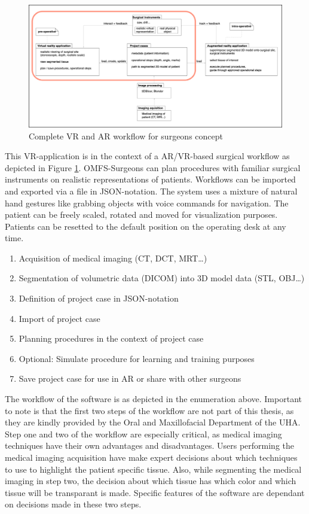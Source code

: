 \begin{figure}[ht!]
    \centering
    \includegraphics[width=\linewidth]{images/project_plan.png}
    \caption{\label{fig::ProjectPlan} Complete VR and AR workflow for surgeons concept}
\end{figure}

This VR-application is in the context of a AR/VR-based surgical workflow as depicted in Figure \ref{fig::ProjectPlan}.
OMFS-Surgeons can plan procedures with familiar surgical instruments on realistic representations of patients.
Workflows can be imported and exported via a file in JSON-notation.
The system uses a mixture of natural hand gestures like grabbing objects with voice commands for navigation.
The patient can be freely scaled, rotated and moved for visualization purposes.
Patients can be resetted to the default position on the operating desk at any time.

\begin{enumerate}
    \setlength\itemsep{-0.5em}
    \item Acquisition of medical imaging (CT, DCT, MRT\ldots)
    \item Segmentation of volumetric data (DICOM) into 3D model data (STL, OBJ\ldots)
    \item Definition of project case in JSON-notation
    \item Import of project case
    \item Planning procedures in the context of project case
    \item Optional: Simulate procedure for learning and training purposes
    \item Save project case for use in AR or share with other surgeons
\end{enumerate}

The workflow of the software is as depicted in the enumeration above.
Important to note is that the first two steps of the workflow are not part of this thesis, as they are kindly provided by the Oral and Maxillofacial Department of the UHA.
Step one and two of the workflow are especially critical, as medical imaging techniques have their own advantages and disadvantages.
Users performing the medical imaging acquisition have make expert decisions about which techniques to use to highlight the patient specific tissue.
Also, while segmenting the medical imaging in step two, the decision about which tissue has which color and which tissue will be transparant is made.
Specific features of the software are dependant on decisions made in these two steps.

